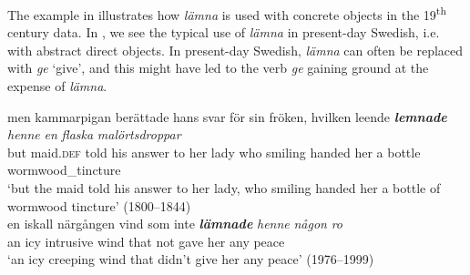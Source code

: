 \documentclass[output=paper]{langscibook}
\begin{document}
\begin{table}
\caption{Frequency measures of the verb-specific DOC with \textit{lämna} ‘hand’\label{tab:valdeson:10}}
\end{table}

The example in  illustrates how \textit{lämna} is used with concrete objects in the 19\textsuperscript{th} century data. In , we see the typical use of \textit{lämna} in present-day Swedish, i.e. with abstract direct objects. In present-day Swedish‚ \textit{lämna} can often be replaced with \textit{ge} ‘give’, and this might have led to the verb \textit{ge} gaining ground at the expense of \textit{lämna}.


\ea \label{ex:valdeson:12}
\gll men kammarpigan   berättade  hans  svar     för     sin     fröken, hvilken leende \textbf{\textit{lemnade}} \textit{henne}  \textit{en}  \textit{flaska}    \textit{malörtsdroppar}\\
  but maid.\textsc{def}        told        his    answer  to  her   lady who       smiling    handed       her        a  bottle       wormwood\_tincture\\
\glt `but the maid told his answer to her lady, who smiling handed her a bottle of wormwood tincture’ (1800–1844)\\
\ex \label{ex:valdeson:13}
\gll en    iskall  närgången  vind   som    inte \textbf{\textit{lämnade}} \textit{henne}  \textit{någon}   \textit{ro}\\
  an   icy          intrusive     wind  that      not  gave      her   any  peace  \\
\glt `an icy creeping wind that didn’t give her any peace’ (1976–1999)
\z
\end{document}
